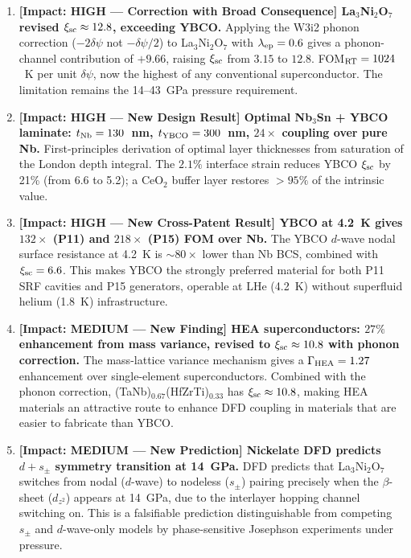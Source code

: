 \documentclass[11pt]{article}
\begin{document}
\begin{enumerate}[leftmargin=*]

\item \textbf{[Impact: HIGH --- Correction with Broad Consequence] La$_3$Ni$_2$O$_7$
  revised $\xi_{\rm sc} \approx 12.8$, exceeding YBCO.}
  Applying the W3i2 phonon correction ($-2\delta\psi$ not $-\delta\psi/2$)
  to La$_3$Ni$_2$O$_7$ with $\lambda_{\rm ep} = 0.6$ gives a phonon-channel
  contribution of $+9.66$, raising $\xi_{\rm sc}$ from $3.15$ to $12.8$.
  FOM$_{\rm RT} = 1024$~K per unit $\delta\psi$, now the highest of
  any conventional superconductor. The limitation remains the 14--43~GPa
  pressure requirement.

\item \textbf{[Impact: HIGH --- New Design Result] Optimal Nb$_3$Sn + YBCO
  laminate: $t_{\rm Nb} = 130$~nm, $t_{\rm YBCO} = 300$~nm, $24\times$
  coupling over pure Nb.}
  First-principles derivation of optimal layer thicknesses from saturation
  of the London depth integral. The $2.1\%$ interface strain reduces YBCO
  $\xi_{\rm sc}$ by 21\% (from 6.6 to 5.2); a CeO$_2$ buffer layer restores
  $> 95\%$ of the intrinsic value.

\item \textbf{[Impact: HIGH --- New Cross-Patent Result] YBCO at 4.2~K gives
  $132\times$ (P11) and $218\times$ (P15) FOM over Nb.}
  The YBCO $d$-wave nodal surface resistance at 4.2~K is $\sim 80\times$
  lower than Nb BCS, combined with $\xi_{\rm sc} = 6.6$. This makes YBCO
  the strongly preferred material for both P11 SRF cavities and P15 generators,
  operable at LHe (4.2~K) without superfluid helium (1.8~K) infrastructure.

\item \textbf{[Impact: MEDIUM --- New Finding] HEA superconductors: $27\%$
  enhancement from mass variance, revised to $\xi_{\rm sc} \approx 10.8$
  with phonon correction.}
  The mass-lattice variance mechanism gives a $\Gamma_{\rm HEA} = 1.27$
  enhancement over single-element superconductors. Combined with the phonon
  correction, (TaNb)$_{0.67}$(HfZrTi)$_{0.33}$ has $\xi_{\rm sc} \approx 10.8$,
  making HEA materials an attractive route to enhance DFD coupling in
  materials that are easier to fabricate than YBCO.

\item \textbf{[Impact: MEDIUM --- New Prediction] Nickelate DFD predicts
  $d + s_\pm$ symmetry transition at 14~GPa.}
  DFD predicts that La$_3$Ni$_2$O$_7$ switches from nodal ($d$-wave)
  to nodeless ($s_\pm$) pairing precisely when the $\beta$-sheet ($d_{z^2}$)
  appears at 14~GPa, due to the interlayer hopping channel switching on.
  This is a falsifiable prediction distinguishable from competing $s_\pm$
  and $d$-wave-only models by phase-sensitive Josephson experiments under
  pressure.

\end{enumerate}
\end{document}
